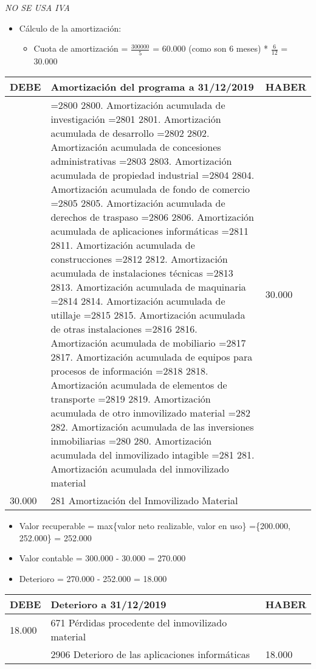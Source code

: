 \documentclass[a4paper,12pt]{article}
\newcommand{\fec}{31/12/}
\newcommand{\valorrecuperable}{Valor recuperable = max\{valor neto realizable, valor en uso\} =}
\newcommand{\VC}{Valor contable = }
\newcommand{\cuotaamort}{Cuota de amortización = }
\newcommand{\myequation}[2]{\ensuremath{\frac{#1}{#2}}}
\newcommand{\cuenta}[1]{
    \ifnum#1=2800 2800. Amortización acumulada de investigación\fi
    \ifnum#1=2801 2801. Amortización acumulada de desarrollo\fi
    \ifnum#1=2802 2802. Amortización acumulada de concesiones administrativas\fi
    \ifnum#1=2803 2803. Amortización acumulada de propiedad industrial\fi
    \ifnum#1=2804 2804. Amortización acumulada de fondo de comercio\fi
    \ifnum#1=2805 2805. Amortización acumulada de derechos de traspaso\fi
    \ifnum#1=2806 2806. Amortización acumulada de aplicaciones informáticas\fi
    \ifnum#1=2811 2811. Amortización acumulada de construcciones\fi
    \ifnum#1=2812 2812. Amortización acumulada de instalaciones técnicas\fi
    \ifnum#1=2813 2813. Amortización acumulada de maquinaria\fi
    \ifnum#1=2814 2814. Amortización acumulada de utillaje\fi
    \ifnum#1=2815 2815. Amortización acumulada de otras instalaciones\fi
    \ifnum#1=2816 2816. Amortización acumulada de mobiliario\fi
    \ifnum#1=2817 2817. Amortización acumulada de equipos para procesos de información\fi
    \ifnum#1=2818 2818. Amortización acumulada de elementos de transporte\fi
    \ifnum#1=2819 2819. Amortización acumulada de otro inmovilizado material\fi
    \ifnum#1=282 282. Amortización acumulada de las inversiones inmobiliarias\fi
    \ifnum#1=280 280. Amortización acumulada del inmovilizado intagible\fi
    \ifnum#1=281 281. Amortización acumulada del inmovilizado material\fi
}
\begin{document}
\begin{tcolorbox}[colback=red!5!white,colframe=yellow!75!black!,title=IMPORTANTE]
    \textit{NO SE USA IVA}
\end{tcolorbox}

\begin{itemize}
    \item Cálculo de la amortización:
    \begin{itemize}
        \item \cuotaamort \myequation{300000}{5} = 60.000 (como son 6 meses) * \myequation{6}{12} = 30.000
    \end{itemize}
\end{itemize}

\begin{table}[H]
    \centering
    \begin{tabular}{|p{3cm}|p{6cm}|p{3cm}|}
    \hline
    \textbf{DEBE} & \textbf{Amortización del programa a \fec2019} & \textbf{HABER} \\
    \hline
    & \cuenta{2806} & 30.000\\
    \hline
    30.000& 281 Amortización del Inmovilizado Material& \\
    \hline
    \end{tabular}
\end{table}


\begin{itemize}
    \item  \valorrecuperable \{200.000, 252.000\} = 252.000
    \item \VC 300.000 - 30.000 = 270.000
    \item Deterioro = 270.000 - 252.000 = 18.000
\end{itemize}

\begin{table}[H]
    \centering
    \begin{tabular}{|p{3cm}|p{6cm}|p{3cm}|}
    \hline
    \textbf{DEBE} & \textbf{Deterioro a \fec2019} & \textbf{HABER} \\
    \hline
    18.000& 671 Pérdidas procedente del inmovilizado material& \\
    \hline
    & 2906 Deterioro de las aplicaciones informáticas& 18.000\\
    \hline
    \end{tabular}
\end{table}
\end{document}
